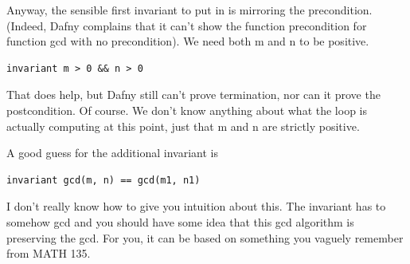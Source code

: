 \documentclass[11pt]{article}
\begin{document}
Anyway, the sensible first invariant to put in is mirroring the precondition. (Indeed, Dafny complains that
it can't show the function precondition for function \textsf{gcd} with no precondition). We need both \textsf{m}
and \textsf{n} to be positive.
\begin{lstlisting}[language=dafny]
  invariant m > 0 && n > 0
\end{lstlisting}
That does help, but Dafny still can't prove termination, nor can it prove the postcondition. Of course.
We don't know anything about what the loop is actually computing at this point, just that \textsf{m} and
\textsf{n} are strictly positive.

A good guess for the additional invariant is
\begin{lstlisting}[language=dafny]
  invariant gcd(m, n) == gcd(m1, n1)
\end{lstlisting}
I don't really know how to give you intuition about this. The
invariant has to somehow \textsf{gcd} and you should have some idea
that this gcd algorithm is preserving the gcd. For you, it can be
based on something you vaguely remember from MATH 135.
\end{document}
